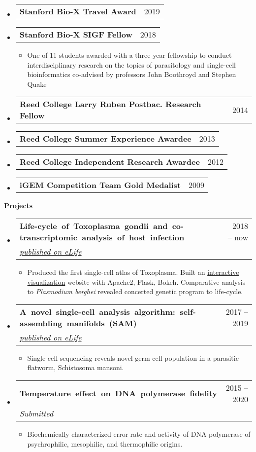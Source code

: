 \documentclass[letterpaper,12pt]{article}[leftmargin=*]
\makeatletter
\def \entryspacing {-0pt}
\renewcommand{\section}[2]{\vspace{5pt}
  \colorbox{secondary}{\color{white}\raggedbottom\normalsize\textbf{{#1}{\hspace{7pt}#2}}}
}
\newcommand{\resumeEntryStart}{\begin{itemize}[leftmargin=2.5mm]}
\newcommand{\resumeEntryEnd}{\end{itemize}\vspace{\entryspacing}}
\newcommand{\resumeItemListStart}{\begin{itemize}[leftmargin=4.5mm]}
\newcommand{\resumeItemListEnd}{\end{itemize}}
\newcommand{\resumeItem}[1]{
  \item\small{
    {#1 \vspace{-2pt}}
  }
}
\newcommand{\resumeEntryTSDL}[4]{
  \vspace{-1pt}\item[]
    \begin{tabularx}{0.97\textwidth}{X@{\hspace{40pt}}r}
      \mbox{\textbf{\color{primary}#1}} & {\firabook\color{accent}\small#2} \\
      \textit{\color{accent}\small#3} & \textit{\color{accent}\small#4} \\
    \end{tabularx}\vspace{-8pt}
}
\newcommand{\resumeEntryTD}[2]{
  \vspace{-1pt}\item[]
    \begin{tabularx}{0.97\textwidth}{X@{\hspace{40pt}}r}
      \textbf{\color{primary}#1} & {\firabook\color{accent}\small#2} \\
    \end{tabularx}\vspace{-6pt}
}
\makeatother
\begin{document}
  \resumeEntryStart
    \resumeEntryTD
      {Stanford Bio-X Travel Award}{2019}
    \resumeEntryTD
      {Stanford Bio-X SIGF Fellow}{2018}
    \resumeItemListStart
      \resumeItem {One of 11 students awarded with a three-year fellowship to conduct interdisciplinary research on the topics of parasitology and single-cell bioinformatics co-advised by professors John Boothroyd and Stephen Quake}
    \resumeItemListEnd
    \resumeEntryTD
      {Reed College Larry Ruben Postbac. Research Fellow}{2014}
    \resumeEntryTD
      {Reed College Summer Experience Awardee}{2013}
    \resumeEntryTD
      {Reed College Independent Research Awardee}{2012}
    \resumeEntryTD
      {iGEM Competition Team Gold Medalist}{2009}
  \resumeEntryEnd

\section{\faFlask}{Projects}
  \resumeEntryStart
    \resumeEntryTSDL
      {Life-cycle of Toxoplasma gondii and co-transcriptomic analysis of host infection}{2018 -- now}
      {\href{https://elifesciences.org/articles/54129}{published on eLife}}{}
    \resumeItemListStart
      \resumeItem {Produced the first single-cell atlas of Toxoplasma. Built an \href{http://st-atlas.org}{interactive visualization} website with Apache2, Flask, Bokeh. Comparative analysis to \textit{Plasmodium berghei} revealed concerted genetic program to life-cycle.}
    \resumeItemListEnd
  \resumeEntryEnd

  \resumeEntryStart
    \resumeEntryTSDL
      {A novel single-cell analysis algorithm: self-assembling manifolds (SAM)}{2017 -- 2019}
      {\href{https://elifesciences.org/articles/48994}{published on eLife}}{}
    \resumeItemListStart
      \resumeItem {Single-cell sequencing reveals novel germ cell population in a parasitic flatworm, Schistosoma mansoni.}
    \resumeItemListEnd
  \resumeEntryEnd

  \resumeEntryStart
    \resumeEntryTSDL
      {Temperature effect on DNA polymerase fidelity}{2015 -- 2020}
      {Submitted}{}
    \resumeItemListStart
      \resumeItem {Biochemically characterized error rate and activity of DNA polymerase of psychrophilic, mesophilic, and thermophilic origins.}
    \resumeItemListEnd
  \resumeEntryEnd


\newpage
\end{document}
